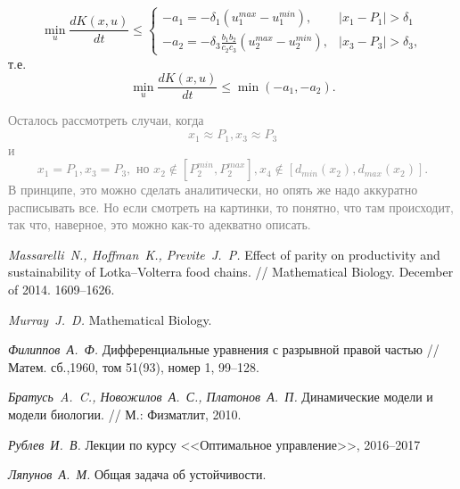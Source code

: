 \documentclass[11pt]{article}
\begin{document}
$$
	\min\limits_u\frac{dK(x,u)}{dt} \leqslant \begin{cases} -a_1 = -\delta_1(u_1^{max} - u_1^{min}), &  |x_1 - P_1| > \delta_1 \\ -a_2 = -\delta_3\frac{b_1b_2}{c_2c_3}(u_2^{max} - u_2^{min}), & |x_3 - P_3| > \delta_3, \end{cases}
$$
т.е.
$$\min\limits_u\frac{dK(x,u)}{dt} \leqslant \min(-a_1, -a_2).$$

\textcolor{gray}{Осталось рассмотреть случаи, когда $$x_1 \approx P_1, x_3 \approx P_3$$ и $$x_1 = P_1, x_3 = P_3, \text{ но } x_2 \notin [P_2^{min}, P_2^{max}], x_4 \notin [d_{min}(x_2), d_{max}(x_2)].$$
В принципе, это можно сделать аналитически, но опять же надо аккуратно расписывать все. Но если смотреть на картинки, то понятно, что там происходит, так что, наверное, это можно как-то адекватно описать.}

\clearpage
\newpage
\begin{thebibliography}{0}
     {\it Massarelli~N., Hoffman~K., Previte~J.~P.} Effect of parity on productivity and sustainability of Lotka–Volterra food chains. // Mathematical Biology. December of 2014. 1609--1626.
    
     {\it Murray~J.~D.} Mathematical Biology.
    
     {\it Филиппов~А.~Ф.} Дифференциальные уравнения с разрывной правой частью // Матем. сб.,1960, том 51(93), номер 1, 99–128.
    
     {\it Братусь~A.~C., Новожилов~А.~С., Платонов~А.~П.} Динамические модели и модели биологии. // М.: Физматлит, 2010.
    
     {\it Рублев~И.~В.} Лекции по курсу <<Оптимальное управление>>, 2016--2017      
    
     {\it Ляпунов~А.~М.} Общая задача об устойчивости.
\end{thebibliography}

    
\end{document}
